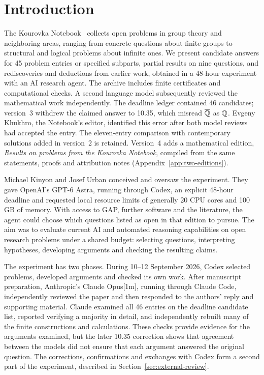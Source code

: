 \section{Introduction}
\label{sec:introduction}

The Kourovka Notebook~\cite{kourovka21} collects open problems in group
theory and neighboring areas, ranging from concrete questions about finite
groups to structural and logical problems about infinite ones. We present
candidate answers for 45 problem entries or specified subparts, partial
results on nine questions, and rediscoveries and deductions from earlier
work, obtained in a 48-hour experiment with an AI research agent.
The archive includes finite certificates and computational checks.
A second language model subsequently reviewed the mathematical work
independently. The deadline ledger contained 46 candidates; version~3
withdrew the claimed answer to 10.35, which misread
\(\overline{\mathbb Q}\) as \(\mathbb Q\). Evgeny Khukhro, the Notebook's editor,
identified this error after both model reviews had accepted the entry.
The eleven-entry comparison with contemporary solutions added in
version~2 is retained. Version~4 adds a mathematical edition,
\emph{Results on problems from the Kourovka Notebook}, compiled from
the same statements, proofs and attribution notes (Appendix~\ref{app:two-editions}).

Michael Kinyon and Josef Urban conceived and oversaw the experiment.
They gave OpenAI's GPT-6 Astra, running through Codex, an explicit
48-hour deadline and requested local resource limits of generally
20 CPU cores and 100\,GB of memory. With access to GAP, further software
and the literature, the agent could choose which questions listed as open
in that edition to pursue. The aim was to evaluate current AI and automated
reasoning capabilities on open research problems under a shared budget:
selecting questions, interpreting hypotheses, developing arguments and
checking the resulting claims.

The experiment has two phases. During 10--12 September 2026, Codex
selected problems, developed arguments and checked its own work. After
manuscript preparation, Anthropic's Claude Opus[1m], running through
Claude Code, independently reviewed the paper and then responded to the
authors' reply and supporting material. Claude examined all 46 entries
on the deadline candidate list, reported verifying a majority in detail, and
independently rebuilt many of the finite constructions and calculations.
These checks provide evidence for the arguments examined, but the later
10.35 correction shows that agreement between the models did not ensure
that each argument answered the original question.
The corrections, confirmations and exchanges with
Codex form a second part of the experiment, described in
Section~\ref{sec:external-review}.

